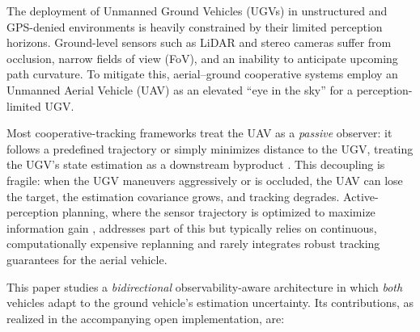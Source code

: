 \documentclass[letterpaper, 10 pt, conference]{ieeeconf}  %
\begin{document}
The deployment of Unmanned Ground Vehicles (UGVs) in unstructured and GPS-denied
environments is heavily constrained by their limited perception horizons.
Ground-level sensors such as LiDAR and stereo cameras suffer from occlusion,
narrow fields of view (FoV), and an inability to anticipate upcoming path
curvature. To mitigate this, aerial--ground cooperative systems employ an
Unmanned Aerial Vehicle (UAV) as an elevated ``eye in the sky'' for a
perception-limited UGV.

Most cooperative-tracking frameworks treat the UAV as a \emph{passive} observer:
it follows a predefined trajectory or simply minimizes distance to the UGV,
treating the UGV's state estimation as a downstream byproduct
\cite{mayne2000constrained}. This decoupling is fragile: when the UGV maneuvers
aggressively or is occluded, the UAV can lose the target, the estimation
covariance grows, and tracking degrades. Active-perception planning, where the
sensor trajectory is optimized to maximize information gain
\cite{falanga2018pampc}, addresses part of this but typically relies on
continuous, computationally expensive replanning and rarely integrates robust
tracking guarantees for the aerial vehicle.

This paper studies a \emph{bidirectional} observability-aware architecture in
which \emph{both} vehicles adapt to the ground vehicle's estimation uncertainty.
Its contributions, as realized in the accompanying open implementation, are:
\end{document}
